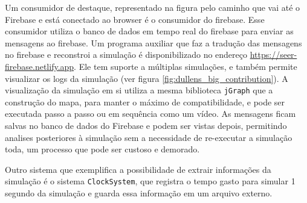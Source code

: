 Um consumidor de destaque, representado na figura pelo caminho que vai até o Firebase e está conectado ao browser é o consumidor do firebase. Esse consumidor utiliza o banco de dados em tempo real do firebase para enviar as mensagens ao firebase. Um programa auxiliar que faz a tradução das mensagens no firebase e reconstroi a simulação é disponibilizado no endereço \url{https://seer-firebase.netlify.app}. Ele tem suporte a múltiplas simulações, e também permite visualizar os logs da simulação (ver figura \ref{fig:dullens_big_contribution}). A visualização da simulação em si utiliza a mesma biblioteca \texttt{jGraph} que a construção do mapa, para manter o máximo de compatibilidade, e pode ser executada passo a passo ou em sequência como um vídeo. As mensagens ficam salvas no banco de dados do Firebase e podem ser vistas depois, permitindo analises posteriores à simulação sem a necessidade de re-executar a simulação toda, um processo que pode ser custoso e demorado. 

Outro sistema que exemplifica a possibilidade de extrair informações da simulação é o sistema \texttt{ClockSystem}, que registra o tempo gasto para simular 1 segundo da simulação e guarda essa informação em um arquivo externo.


